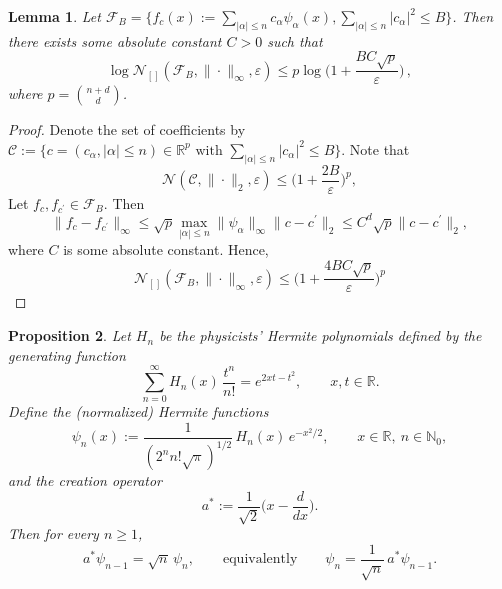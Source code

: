 \documentclass[11pt]{article}
\newtheorem{proposition}{Proposition}[section] %
\newtheorem{lemma}[proposition]{Lemma}         %
\theoremstyle{remark}
\numberwithin{equation}{section}
\newcommand{\R}{\mathbb{R}}
\newcommand{\N}{\mathbb{N}}
\begin{document}
\begin{lemma}
\label{bracketing number}
Let $\mathcal F_B = \{f_c(x) := \sum_{|\alpha| \le n} c_\alpha \psi_\alpha(x), \sum_{|\alpha| \le n} |c_{\alpha}|^2 \le B\}$. 
Then there exists some absolute constant $C > 0$ such that
$$
\log \mathcal N_{[]}(\mathcal F_B, \| \cdot \|_\infty, \varepsilon) \le p \log \bigg (1 + \frac{BC \sqrt{p}}{\varepsilon} \bigg )\, ,
$$
where $p = \binom{n+d}{d}$.
\end{lemma}
\begin{proof}
    Denote the set of coefficients by $\mathcal C:= \{c = (c_\alpha, |\alpha| \le n) \in \R^p \text{ with } \sum_{|\alpha| \le n} |c_{\alpha}|^2 \le B\}$. Note that
    $$
    \mathcal N(\mathcal C, \|\cdot\|_2, \varepsilon) \le \bigg (1 + \frac{2B}{\varepsilon} \bigg)^p,
    $$
    Let $f_{c}, f_{c^\prime} \in \mathcal F_B$. Then
    $$
    \| f_c - f_{c^\prime} \|_\infty \le \sqrt{p} \max_{|\alpha| \le n} \|\psi_\alpha\|_\infty \|c - c^\prime\|_2 \le C^d \sqrt{p} \|c - c^\prime\|_2,
    $$ 
    where $C$ is some absolute constant. 
    Hence,
    $$
    \mathcal N_{[]}(\mathcal F_B, \| \cdot \|_\infty, \varepsilon) \le \bigg (1 + \frac{4BC \sqrt{p}}{\varepsilon} \bigg)^p
    $$
\end{proof}

\begin{proposition}\label{prop:raising-direct}
Let $H_n$ be the \emph{physicists' Hermite polynomials} defined by the generating function
\[
\sum_{n=0}^\infty H_n(x)\,\frac{t^n}{n!}=e^{2xt-t^2},\qquad x,t\in\R.
\]
Define the (normalized) Hermite functions
\begin{equation}\label{eq:psi-phys}
\psi_n(x):=\frac{1}{(2^n n!\sqrt\pi)^{1/2}}\,H_n(x)\,e^{-x^2/2},
\qquad x\in\R,\ n\in\N_0,
\end{equation}
and the creation operator
\[
a^\ast:=\frac{1}{\sqrt2}\Big(x-\frac{d}{dx}\Big).
\]
Then for every $n\ge 1$,
\begin{equation}\label{eq:raising-identity}
a^\ast \psi_{n-1}=\sqrt n\,\psi_n,
\qquad\text{equivalently}\qquad
\psi_n=\frac{1}{\sqrt n}\,a^\ast\psi_{n-1}.
\end{equation}
\end{proposition}
\end{document}
